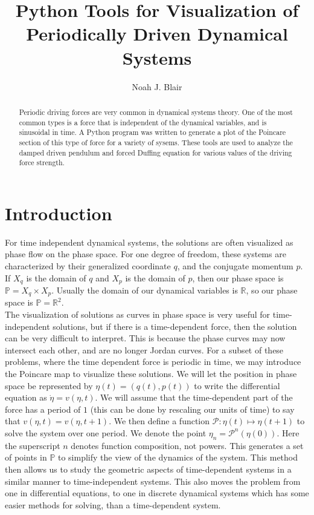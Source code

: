 \documentclass{article}
\author{Noah J. Blair}
\title{Python Tools for Visualization of  Periodically Driven Dynamical Systems}
\newcommand{\bb}[1]{\mathbb{#1}}
\newcommand{\mc}[1]{\mathcal{#1}}
\begin{document}
\maketitle
\begin{abstract}
Periodic driving forces are very common in dynamical systems theory. One of the most common types is a force that is independent of the dynamical variables, and is sinusoidal in time. A Python program was written to generate a plot of the Poincare section of this type of force for a variety of sysems. These tools are used to analyze the damped driven pendulum and forced Duffing equation for various values of the driving force strength.
\end{abstract}
\section{Introduction}
For time independent dynamical systems, the solutions are often visualized as phase flow on the phase space. For one degree of freedom, these systems are characterized by their generalized coordinate $q$, and the conjugate momentum $p$. If $X_q$ is the domain of $q$ and $X_p$ is the domain of $p$, then our phase space is $\bb{P}=X_q\times X_p$. Usually the domain of our dynamical variables is $\bb{R}$, so our phase space is $\bb{P}=\bb{R}^2$.\\
The visualization of solutions as curves in phase space is very useful for time-independent solutions, but if there is a time-dependent force, then the solution can be very difficult to interpret. This is because the phase curves may now intersect each other, and are no longer Jordan curves. For a subset of these problems, where the time dependent force is periodic in time, we may introduce the Poincare map to visualize these solutions. We will let the position in phase space be represented by $\eta(t)=(q(t),p(t))$ to write the differential equation as $\dot{\eta}=v(\eta,t)$. We will assume that the time-dependent part of the force has a period of $1$ (this can be done by rescaling our units of time) to say that $v(\eta,t)=v(\eta,t+1)$. We then define a function $\mc{P}:\eta(t)\mapsto\eta(t+1)$ to solve the system over one period. We denote the point $\eta_n=\mc{P}^n(\eta(0))$. Here the superscript $n$ denotes function composition, not powers. This generates a set of points in $\bb{P}$ to simplify the view of the dynamics of the system. This method then allows us to study the geometric aspects of time-dependent systems in a similar manner to time-independent systems. This also moves the problem from one in differential equations, to one in discrete dynamical systems which has some easier methods for solving, than a time-dependent system.
\end{document}
